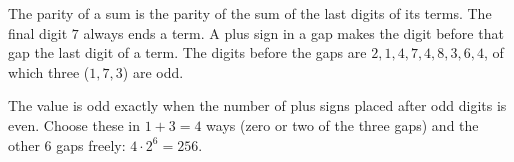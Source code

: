 The parity of a sum is the parity of the sum of the last digits of its terms. The final digit $7$ always ends a term. A plus sign in a gap makes the digit before that gap the last digit of a term. The digits before the gaps are $2,1,4,7,4,8,3,6,4$, of which three ($1,7,3$) are odd.

The value is odd exactly when the number of plus signs placed after odd digits is even. Choose these in $1+3=4$ ways (zero or two of the three gaps) and the other $6$ gaps freely: $4\cdot2^6=\boxed{256}$.
